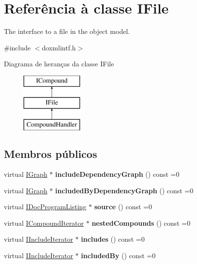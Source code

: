 \hypertarget{class_i_file}{\section{Referência à classe I\-File}
\label{class_i_file}
}


The interface to a file in the object model.  




{\ttfamily \#include $<$doxmlintf.\-h$>$}

Diagrama de heranças da classe I\-File\begin{figure}[H]
\begin{center}
\leavevmode
\includegraphics[height=3.000000cm]{class_i_file}
\end{center}
\end{figure}
\subsection*{Membros públicos}
\begin{DoxyCompactItemize}
\item 
\hypertarget{class_i_file_a742349cf2493aac5e253bb435b39bdc1}{virtual \hyperlink{class_i_graph}{I\-Graph} $\ast$ {\bfseries include\-Dependency\-Graph} () const =0}\label{class_i_file_a742349cf2493aac5e253bb435b39bdc1}

\item 
\hypertarget{class_i_file_aee60779e3e6c06d4289f193a6034a95e}{virtual \hyperlink{class_i_graph}{I\-Graph} $\ast$ {\bfseries included\-By\-Dependency\-Graph} () const =0}\label{class_i_file_aee60779e3e6c06d4289f193a6034a95e}

\item 
\hypertarget{class_i_file_ac80e16c727c4b03d70311aeb7c712d54}{virtual \hyperlink{class_i_doc_program_listing}{I\-Doc\-Program\-Listing} $\ast$ {\bfseries source} () const =0}\label{class_i_file_ac80e16c727c4b03d70311aeb7c712d54}

\item 
\hypertarget{class_i_file_a6a1aab20f15a204af0b8d3e8470817bd}{virtual \hyperlink{class_i_compound_iterator}{I\-Compound\-Iterator} $\ast$ {\bfseries nested\-Compounds} () const =0}\label{class_i_file_a6a1aab20f15a204af0b8d3e8470817bd}

\item 
\hypertarget{class_i_file_afd488b4e57cb89a77d85d1f37743d7b6}{virtual \hyperlink{class_i_include_iterator}{I\-Include\-Iterator} $\ast$ {\bfseries includes} () const =0}\label{class_i_file_afd488b4e57cb89a77d85d1f37743d7b6}

\item 
\hypertarget{class_i_file_aa9bd86a6cd63cb027e738f19265b32be}{virtual \hyperlink{class_i_include_iterator}{I\-Include\-Iterator} $\ast$ {\bfseries included\-By} () const =0}\label{class_i_file_aa9bd86a6cd63cb027e738f19265b32be}

\end{DoxyCompactItemize}
